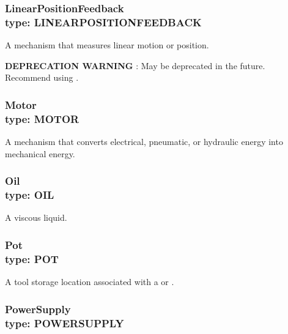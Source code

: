 \subsubsection[LinearPositionFeedback]{LinearPositionFeedback \\ {\small type: LINEAR\textunderscore POSITION\textunderscore FEEDBACK}}
\label{sec:LinearPositionFeedback}



A mechanism that measures linear motion or position.

\textbf{DEPRECATION WARNING} : May be deprecated in the future. Recommend using .



\subsubsection[Motor]{Motor \\ {\small type: MOTOR}}
\label{sec:Motor}



A mechanism that converts electrical, pneumatic, or hydraulic energy into mechanical energy.



\subsubsection[Oil]{Oil \\ {\small type: OIL}}
\label{sec:Oil}



A viscous liquid.



\subsubsection[Pot]{Pot \\ {\small type: POT}}
\label{sec:Pot}



A tool storage location associated with a  or .



\subsubsection[PowerSupply]{PowerSupply \\ {\small type: POWER\textunderscore SUPPLY}}
\label{sec:PowerSupply}



